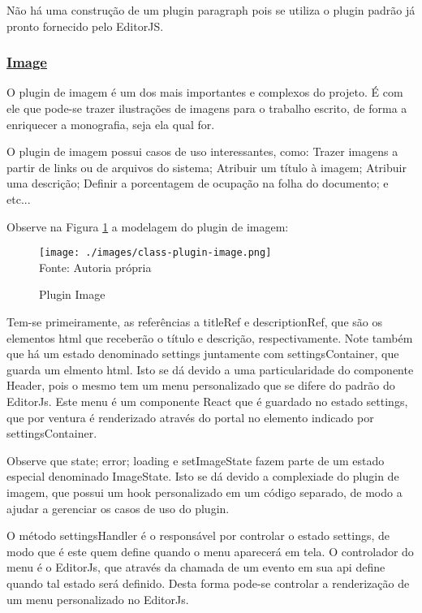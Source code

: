 Não há uma construção de um plugin paragraph pois se utiliza
o plugin padrão já pronto fornecido pelo EditorJS.

\subsubsection{\underline{Image}}

O plugin de imagem é um dos mais importantes e complexos do projeto.
É com ele que pode-se trazer ilustrações de imagens para o trabalho escrito,
de forma a enriquecer a monografia, seja ela qual for.

O plugin de imagem possui casos de uso interessantes, como: Trazer imagens
a partir de links ou de arquivos do sistema; Atribuir um título à imagem;
Atribuir uma descrição; Definir a porcentagem de ocupação na folha do documento;
e etc...


Observe na
Figura \ref{fig:class-plugin-image}
a modelagem do plugin de imagem:

\begin{figure}[H]
    \centering
    \caption{Plugin Image}
    \texttt{[image: ./images/class-plugin-image.png]}
    \label{fig:class-plugin-image} \\
    \textnormal{\fontsize{10pt}{12pt}Fonte: Autoria própria}
\end{figure}

Tem-se primeiramente, as referências a titleRef e descriptionRef, que são
os elementos
\acrshort{html}
que receberão o título e descrição, respectivamente.
Note também que há um estado denominado settings juntamente com settingsContainer,
que guarda um elmento
\acrshort{html}.
Isto se dá devido a uma particularidade do componente Header, pois o mesmo
tem um menu personalizado que se difere do padrão do EditorJs. Este menu é
um componente React que é guardado
no estado settings, que por ventura é renderizado através do portal no elemento
indicado por settingsContainer.

Observe que state; error; loading e setImageState fazem parte de um estado especial
denominado ImageState. Isto se dá devido a complexiade do plugin de imagem, que possui
um hook personalizado em um código separado, de modo a ajudar a gerenciar os casos
de uso do plugin.

O método settingsHandler é o responsável por controlar o estado settings, de modo que
é este quem define quando o menu aparecerá em tela. O controlador do menu é o EditorJs,
que através da chamada de um evento em sua
\acrshort{api}
define quando tal estado será definido.
Desta forma pode-se controlar a renderização de um menu personalizado no EditorJs.

